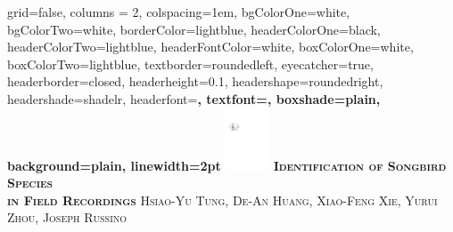 \documentclass[portrait,final,paperwidth=31truein,paperheight=38truein,fontscale=0.35, margin=1truein]{baposter}
\begin{document}



\begin{poster}%
  {
  grid=false,
  columns = 2,
  colspacing=1em,
  bgColorOne=white,
  bgColorTwo=white,
  borderColor=lightblue,
  headerColorOne=black,
  headerColorTwo=lightblue,
  headerFontColor=white,
  boxColorOne=white,
  boxColorTwo=lightblue,
  textborder=roundedleft,
  eyecatcher=true,
  headerborder=closed,
  headerheight=0.1\textheight,
  headershape=roundedright,
  headershade=shadelr,
  headerfont=\Large\bf\textsc, %
  textfont={\setlength{\parindent}{1.5em}},
  boxshade=plain,
  background=plain,
  linewidth=2pt
  }
  {\includegraphics[height=5em]{images/graph_occluded.pdf}}
  {\bf\textsc{Identification of Songbird Species \\ in Field Recordings}\vspace{0.5em}}
  {\textsc{Hsiao-Yu Tung, De-An Huang, Xiao-Feng Xie, Yurui Zhou, Joseph Russino }}

\end{poster}
\end{document}
